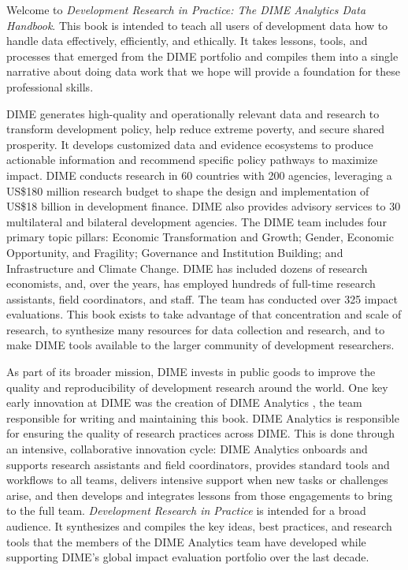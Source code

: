 \begin{fullwidth}
Welcome to \textit{Development Research in Practice: The DIME Analytics Data Handbook}.
This book is intended to teach all users of development data
how to handle data effectively, efficiently, and ethically.
It takes lessons, tools, and processes that emerged from the DIME portfolio
and compiles them into a single narrative about doing data work
that we hope will provide a foundation for these professional skills.

DIME generates high-quality and operationally relevant data and research
to transform development policy, help reduce extreme poverty, and secure shared prosperity.
It develops customized data and evidence ecosystems to produce actionable information
and recommend specific policy pathways to maximize impact.
DIME conducts research in 60 countries with 200 agencies, leveraging a
US\$180 million research budget to shape the design and implementation of
US\$18 billion in development finance.
DIME also provides advisory services to 30 multilateral and bilateral development agencies.
The DIME team includes four primary topic pillars:
Economic Transformation and Growth;
Gender, Economic Opportunity, and Fragility;
Governance and Institution Building;
and Infrastructure and Climate Change.
DIME has included dozens of research economists,
and, over the years, has employed hundreds of full-time research assistants, field coordinators, and staff.
The team has conducted over 325 impact evaluations.
This book exists to take advantage of that concentration and scale of research,
to synthesize many resources for data collection and research,
and to make DIME tools available to the larger community of development researchers.

As part of its broader mission, DIME invests in public goods
to improve the quality and reproducibility of development research around the world.
One key early innovation at DIME was the creation of DIME Analytics ,
the team responsible for writing and maintaining this book.
DIME Analytics is responsible for ensuring the quality of research practices across DIME.
This is done through an intensive, collaborative innovation cycle:
DIME Analytics onboards and supports research assistants and field coordinators,
provides standard tools and workflows to all teams,
delivers intensive support when new tasks or challenges arise,
and then develops and integrates lessons from those engagements to bring to the full team.
\textit{Development Research in Practice} is intended for a broad audience.
It synthesizes and compiles the key ideas, best practices, and research tools
that the members of the DIME Analytics team have developed while supporting
DIME's global impact evaluation portfolio over the last decade.

\end{fullwidth}

